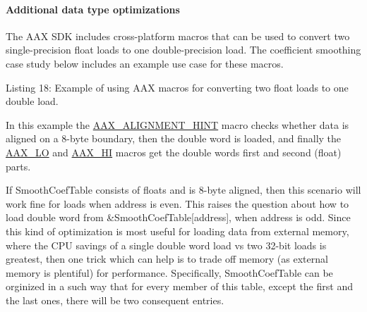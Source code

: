 \hypertarget{a00832_subsubsection__additional_data_type_optimizations_}{}\paragraph{Additional data type optimizations}\label{a00832_subsubsection__additional_data_type_optimizations_}
 The A\+AX S\+DK includes cross-\/platform macros that can be used to convert two single-\/precision float loads to one double-\/precision load. The coefficient smoothing case study below includes an example use case for these macros.


\begin{DoxyCode}{0}
\end{DoxyCode}
  Listing 18\+: Example of using A\+AX macros for converting two {\ttfamily float} loads to one {\ttfamily double} load.

In this example the \mbox{\hyperlink{a00770_a7eb399409be7572c8bd589395c450cdc}{A\+A\+X\+\_\+\+A\+L\+I\+G\+N\+M\+E\+N\+T\+\_\+\+H\+I\+NT}} macro checks whether data is aligned on a 8-\/byte boundary, then the double word is loaded, and finally the \mbox{\hyperlink{a00770_a30b9af679d91539e6aa0871d36c4b024}{A\+A\+X\+\_\+\+LO}} and \mbox{\hyperlink{a00770_a51ea059e820f6ca326531adb132183c3}{A\+A\+X\+\_\+\+HI}} macros get the double word\textquotesingle{}s first and second ({\ttfamily float}) parts.

If {\ttfamily Smooth\+Coef\+Table} consists of floats and is 8-\/byte aligned, then this scenario will work fine for loads when {\ttfamily address} is even. This raises the question about how to load double word from {\ttfamily \&Smooth\+Coef\+Table\mbox{[}address\mbox{]}}, when {\ttfamily address} is odd. Since this kind of optimization is most useful for loading data from external memory, where the C\+PU savings of a single double word load vs two 32-\/bit loads is greatest, then one trick which can help is to trade off memory (as external memory is plentiful) for performance. Specifically, {\ttfamily Smooth\+Coef\+Table} can be orginized in a such way that for every member of this table, except the first and the last ones, there will be two consequent entries.


